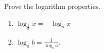 \begin{frame}
\begin{example}
Prove the logarithm properties.
\begin{enumerate}
\item  $\log_{\frac{1}{a}}x=-\log_a x$
\item  $\log_{a}b=\frac{1}{\log_b a}$.
\end{enumerate}

\end{example}
\end{frame}